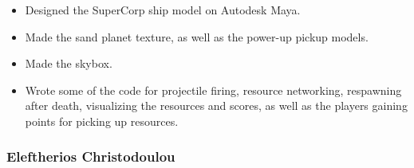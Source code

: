 \documentclass[11pt,a4paper]{article}
\begin{document}
        \begin{itemize}
          \item Designed the SuperCorp ship model on Autodesk Maya. 
          \item Made the sand planet texture, as well as the power-up pickup models. 
          \item Made the skybox. 
          \item Wrote some of the code for projectile firing, resource networking, respawning after death, visualizing the resources and scores, as well as the players gaining points for picking up resources.
        \end{itemize}

        \pagebreak
        \subsubsection{Eleftherios Christodoulou}
\end{document}
